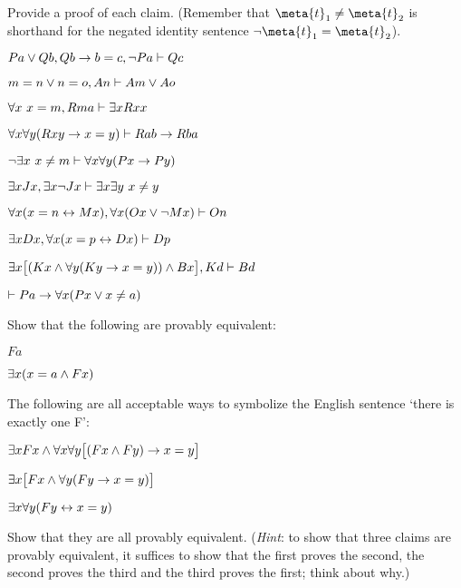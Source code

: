 \problempart
\label{pr.identity}
Provide a proof of each claim. (Remember that $\meta{t}_1 \neq \meta{t}_2$ is shorthand for the negated identity sentence $\enot \meta{t}_1 = \meta{t}_2$).
\begin{earg}
\item $Pa \vee Qb, Qb \rightarrow b=c, \neg Pa \vdash Qc$
\item $m=n \vee n=o, An \vdash Am \vee Ao$
\item $\forall x\ x=m, Rma\vdash \exists x Rxx$
\item $\forall x\forall y(Rxy \rightarrow x=y)\vdash Rab \rightarrow Rba$
\item $\neg \exists x \ x \neq m \vdash \forall x\forall y (Px \rightarrow Py)$
\item $\exists x Jx, \exists x \neg Jx\vdash \exists x \exists y\ x \neq y$
\item $\forall x(x=n \leftrightarrow Mx), \forall x(Ox \vee \neg Mx)\vdash On$
\item $\exists x Dx, \forall x(x=p \leftrightarrow Dx)\vdash Dp$
\item $\exists x\bigl[(Kx \wedge \forall y(Ky \rightarrow x=y)) \wedge Bx\bigr], Kd\vdash Bd$
\item $\vdash Pa \rightarrow \forall x(Px \vee  x \neq a)$
\end{earg}

\problempart
Show that the following are provably equivalent:
\begin{ebullet}
\item $Fa$
\item $\exists x(x = a \wedge Fx)$
\end{ebullet}


\problempart
The following are all acceptable ways to symbolize the English sentence `there is exactly one F':
\begin{ebullet}
\item $\exists x Fx \wedge \forall x \forall y \bigl[(Fx \wedge Fy) \rightarrow x = y\bigr]$
\item $\exists x \bigl[Fx \wedge \forall y (Fy \rightarrow x = y)\bigr]$
\item $\exists x \forall y (Fy \leftrightarrow x = y)$
\end{ebullet}
Show that they are all provably equivalent. (\emph{Hint}: to show that three claims are provably equivalent, it suffices to show that the first proves the second, the second proves the third and the third proves the first; think about why.)


